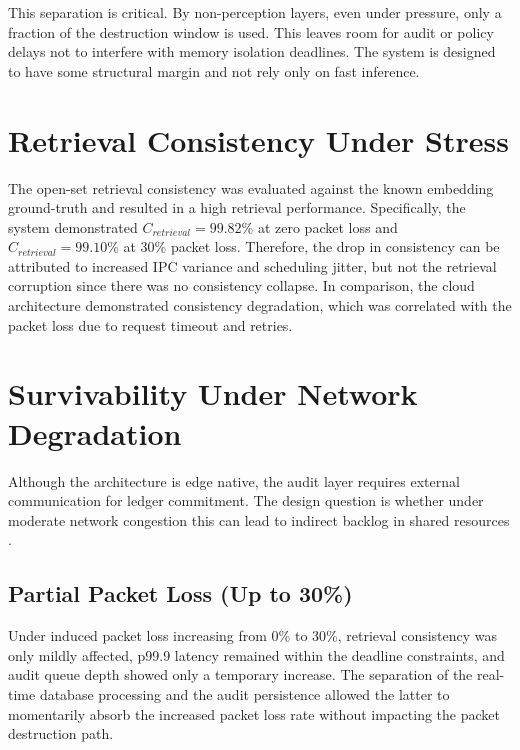\documentclass[conference]{IEEEtran}
\begin{document}
This separation is critical. By non-perception layers, even under pressure, only a fraction of the destruction window is used. This leaves room for audit or policy delays not to interfere with memory isolation deadlines. The system is designed to have some structural margin and not rely only on fast inference.

\section{Retrieval Consistency Under Stress}

The open-set retrieval consistency was evaluated against the known embedding ground-truth and resulted in a high retrieval performance. Specifically, the system demonstrated $C_{retrieval} = 99.82\%$ at zero packet loss and $C_{retrieval} = 99.10\%$ at 30\% packet loss. Therefore, the drop in consistency can be attributed to increased IPC variance and scheduling jitter, but not the retrieval corruption since there was no consistency collapse. In comparison, the cloud architecture demonstrated consistency degradation, which was correlated with the packet loss due to request timeout and retries.

\section{Survivability Under Network Degradation}

Although the architecture is edge native, the audit layer requires external communication for ledger commitment. The design question is whether under moderate network congestion this can lead to indirect backlog in shared resources \cite{b22}.

\subsection{Partial Packet Loss (Up to 30\%)}
Under induced packet loss increasing from 0\% to 30\%, retrieval consistency was only mildly affected, p99.9 latency remained within the deadline constraints, and audit queue depth showed only a temporary increase. The separation of the real-time database processing and the audit persistence allowed the latter to momentarily absorb the increased packet loss rate without impacting the packet destruction path.
\end{document}
